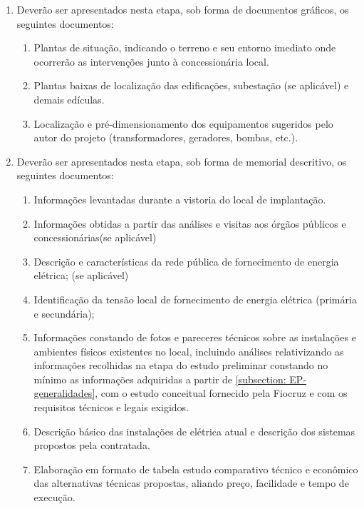 \begin{enumerate}
	
	\item Deverão ser apresentados nesta etapa, sob forma de documentos gráficos, os seguintes documentos:
		\begin{enumerate}
			\item Plantas de situação, indicando o terreno e seu entorno imediato onde ocorrerão as intervenções junto à concessionária local.
		
			\item Plantas baixas de localização das edificações, subestação (se aplicável) e demais edículas.
		
			\item Localização e pré-dimensionamento dos equipamentos sugeridos pelo autor do projeto (transformadores, geradores, bombas, etc.).
		\end{enumerate}

	\item Deverão ser apresentados nesta etapa, sob forma de memorial descritivo, os seguintes documentos:
		\begin{enumerate}
			\item Informações levantadas durante a vistoria do local de implantação.
			
			\item Informações obtidas a partir das análises e visitas aos órgãos públicos e concessionárias(se aplicável)
			
			\item Descrição e características da rede pública de fornecimento de energia elétrica; (se aplicável)
			
			\item Identificação da tensão local de fornecimento de energia elétrica (primária e secundária); 
			
			\item Informações constando de fotos e pareceres técnicos sobre as instalações e ambientes físicos existentes no local, incluindo análises relativizando as informações recolhidas na etapa do estudo preliminar constando no mínimo as informações adquiridas a partir de \ref{subsection: EP-generalidades}, com o estudo conceitual fornecido pela Fiocruz e com os requisitos técnicos e legais exigidos.
			
			\item Descrição básico das instalações de elétrica atual e descrição dos sistemas propostos pela contratada.
			
			\item Elaboração em formato de tabela estudo comparativo técnico e econômico das alternativas técnicas propostas, aliando preço, facilidade e tempo de execução.
			

\end{enumerate}
\end{enumerate}
